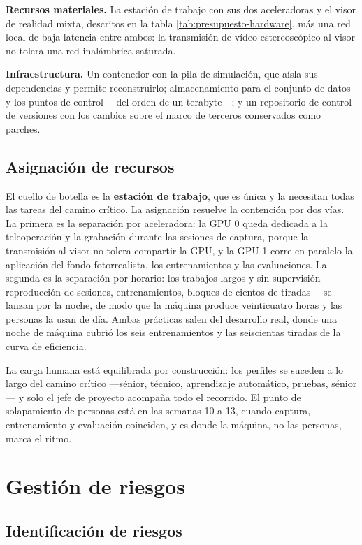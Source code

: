 \textbf{Recursos materiales.} La estación de trabajo con sus dos aceleradoras y el visor de realidad
mixta, descritos en la tabla \ref{tab:presupuesto-hardware}, más una red local de baja latencia
entre ambos: la transmisión de vídeo estereoscópico al visor no tolera una red inalámbrica
saturada.

\textbf{Infraestructura.} Un contenedor con la pila de simulación, que aísla sus dependencias y
permite reconstruirlo; almacenamiento para el conjunto de datos y los puntos de control —del orden
de un terabyte—; y un repositorio de control de versiones con los cambios sobre el marco de
terceros conservados como parches.

\subsection{Asignación de recursos}

El cuello de botella es la \textbf{estación de trabajo}, que es única y la necesitan todas las
tareas del camino crítico. La asignación resuelve la contención por dos vías. La primera es la
separación por aceleradora: la GPU 0 queda dedicada a la teleoperación y la grabación durante las
sesiones de captura, porque la transmisión al visor no tolera compartir la GPU, y la GPU 1 corre en
paralelo la aplicación del fondo fotorrealista, los entrenamientos y las evaluaciones. La segunda es
la separación por horario: los trabajos largos y sin supervisión —reproducción de sesiones,
entrenamientos, bloques de cientos de tiradas— se lanzan por la noche, de modo que la máquina
produce veinticuatro horas y las personas la usan de día. Ambas prácticas salen del desarrollo real,
donde una noche de máquina cubrió los seis entrenamientos y las seiscientas tiradas de la curva de
eficiencia.

La carga humana está equilibrada por construcción: los perfiles se suceden a lo largo del camino
crítico —sénior, técnico, aprendizaje automático, pruebas, sénior— y solo el jefe de proyecto
acompaña todo el recorrido. El punto de solapamiento de personas está en las semanas 10 a 13,
cuando captura, entrenamiento y evaluación coinciden, y es donde la máquina, no las personas, marca
el ritmo.


\section{Gestión de riesgos}
\label{sec:riesgos}

\subsection{Identificación de riesgos}

